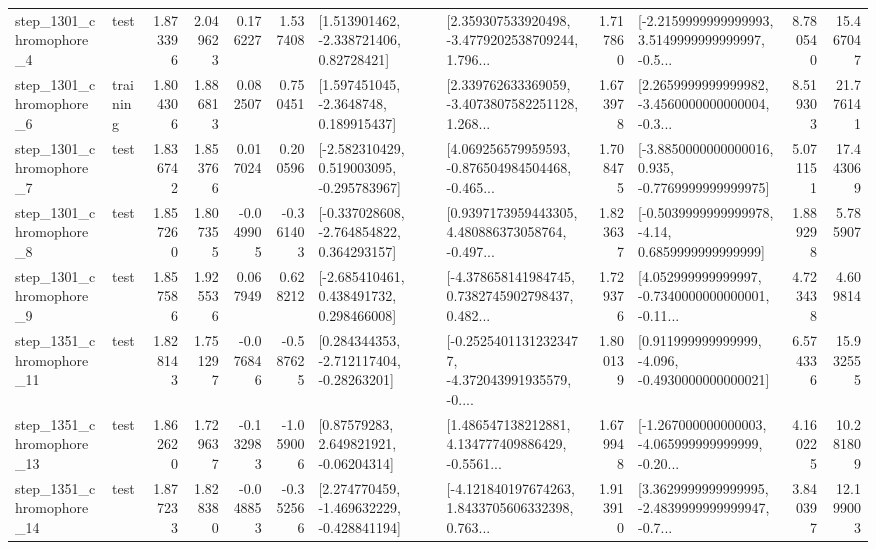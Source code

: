 \begin{tabular}{llrrrrllrlrr}
  step\_1301\_chromophore\_4 &      test &      1.873396 &    2.049623 &      0.176227 &  1.537408 &     [1.513901462, -2.338721406, 0.82728421] &  [2.359307533920498, -3.4779202538709244, 1.796... &       1.717860 &  [-2.2159999999999993, 3.5149999999999997, -0.5... &            8.780540 &         15.467047 \\
  step\_1301\_chromophore\_6 &  training &      1.804306 &    1.886813 &      0.082507 &  0.750451 &      [1.597451045, -2.3648748, 0.189915437] &  [2.339762633369059, -3.4073807582251128, 1.268... &       1.673978 &  [2.2659999999999982, -3.4560000000000004, -0.3... &            8.519303 &         21.776141 \\
  step\_1301\_chromophore\_7 &      test &      1.836742 &    1.853766 &      0.017024 &  0.200596 &   [-2.582310429, 0.519003095, -0.295783967] &  [4.069256579959593, -0.876504984504468, -0.465... &       1.708475 &  [-3.8850000000000016, 0.935, -0.7769999999999975] &            5.071151 &         17.443069 \\
  step\_1301\_chromophore\_8 &      test &      1.857260 &    1.807355 &     -0.049905 & -0.361403 &   [-0.337028608, -2.764854822, 0.364293157] &  [0.9397173959443305, 4.480886373058764, -0.497... &       1.823637 &   [-0.5039999999999978, -4.14, 0.6859999999999999] &            1.889298 &          5.785907 \\
  step\_1301\_chromophore\_9 &      test &      1.857586 &    1.925536 &      0.067949 &  0.628212 &    [-2.685410461, 0.438491732, 0.298466008] &  [-4.378658141984745, 0.7382745902798437, 0.482... &       1.729376 &  [4.052999999999997, -0.7340000000000001, -0.11... &            4.723438 &          4.609814 \\
 step\_1351\_chromophore\_11 &      test &      1.828143 &    1.751297 &     -0.076846 & -0.587625 &    [0.284344353, -2.712117404, -0.28263201] &  [-0.25254011312323477, -4.372043991935579, -0.... &       1.800139 &   [0.911999999999999, -4.096, -0.4930000000000021] &            6.574336 &         15.932555 \\
 step\_1351\_chromophore\_13 &      test &      1.862620 &    1.729637 &     -0.132983 & -1.059006 &      [0.87579283, 2.649821921, -0.06204314] &  [1.486547138212881, 4.134777409886429, -0.5561... &       1.679948 &  [-1.267000000000003, -4.065999999999999, -0.20... &            4.160225 &         10.281809 \\
 step\_1351\_chromophore\_14 &      test &      1.877233 &    1.828380 &     -0.048853 & -0.352566 &   [2.274770459, -1.469632229, -0.428841194] &  [-4.121840197674263, 1.8433705606332398, 0.763... &       1.913910 &  [3.3629999999999995, -2.4839999999999947, -0.7... &            3.840397 &         12.199003 \\

\end{tabular}
